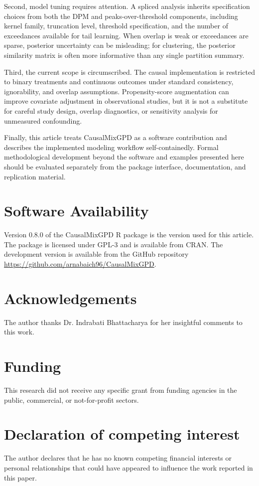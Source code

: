 \documentclass[preprint,12pt,authoryear]{elsarticle}
\newcommand{\pkg}[1]{\textsf{#1}}
\begin{document}
Second, model tuning requires attention.  A spliced analysis inherits
specification choices from both the DPM and peaks-over-threshold
components, including kernel family, truncation level, threshold
specification, and the number of exceedances available for tail
learning.  When overlap is weak or exceedances are sparse, posterior
uncertainty can be misleading; for clustering, the posterior
similarity matrix is often more informative than any single partition
summary.

Third, the current scope is circumscribed.  The causal implementation
is restricted to binary treatments and continuous outcomes under
standard consistency, ignorability, and overlap assumptions.
Propensity-score augmentation can improve covariate adjustment in
observational studies, but it is not a substitute for careful study
design, overlap diagnostics, or sensitivity analysis for unmeasured
confounding.

Finally, this article treats \pkg{CausalMixGPD} as a software
contribution and describes the implemented modeling workflow
self-containedly.  Formal methodological development beyond the
software and examples presented here should be evaluated separately
from the package interface, documentation, and replication material.

\section{Software Availability}
\label{sec:software}

Version 0.8.0 of the \pkg{CausalMixGPD} R package is the version used
for this article. The package is licensed under GPL-3 and is available
from CRAN.
The development version is available from the GitHub repository
\url{https://github.com/arnabaich96/CausalMixGPD}.

\section*{Acknowledgements}
The author thanks Dr. Indrabati Bhattacharya for her insightful comments to this work.

\section*{Funding}
This research did not receive any specific grant from funding agencies in the
public, commercial, or not-for-profit sectors.

\section*{Declaration of competing interest}
The author declares that he has no known competing financial interests or
personal relationships that could have appeared to influence the work reported
in this paper.
\end{document}
